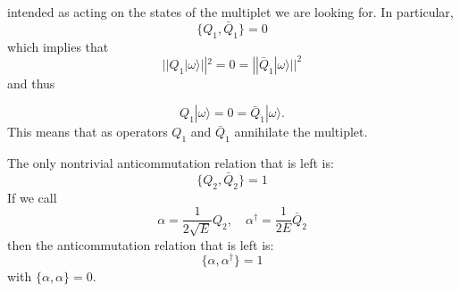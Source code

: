 intended as acting on the states of the multiplet we are looking for. In
particular,
\begin{equation}
\{Q_1, \bar{Q}_{\dot{1}}\} = 0
\end{equation}
which implies that 
\begin{equation}
  ||Q_1|\omega\rangle||^2 = 0 = ||\bar{Q}_{\dot{1}}|\omega\rangle||^2
\end{equation}
and thus

\begin{equation}
  Q_1|\omega\rangle = 0 = \bar{Q}_{\dot{1}}|\omega\rangle.
\end{equation}
This means that as operators $Q_1$ and $\bar{Q}_{\dot{1}}$ annihilate the
multiplet. 
\par The only nontrivial anticommutation relation that is left is:
\begin{equation}
  \{Q_2,\bar{Q}_{\dot{2}}\} = 1
\end{equation}
If we call
\begin{equation}
  \alpha = \frac{1}{2\sqrt{E}}Q_2,\quad \alpha^\dagger
  = \frac{1}{2E}\bar{Q}_{\dot{2}}
\end{equation}
then the anticommutation relation that is left is:
\begin{equation}
  \{\alpha,\alpha^\dagger\} = 1
\end{equation}
with $\{\alpha,\alpha\} = 0$.

